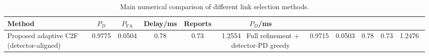 \begin{table}[t]
    \centering
    \caption{Main numerical comparison of different link selection methods.}
    \label{tab:main_summary}
    \begin{tabular}{l c c c c c}
        \hline
        Method & $P_D$ & $P_{\mathrm{FA}}$ & Delay/ms & Reports & $P_D$/ms \\
        \hline
        Proposed adaptive C2F (detector-aligned) & 0.9775 & 0.0504 & 0.78 & 0.73 & 1.2554 \
        Full refinement + detector-PD greedy & 0.9715 & 0.0503 & 0.78 & 0.73 & 1.2476 \
        \hline
    \end{tabular}
\end{table}
